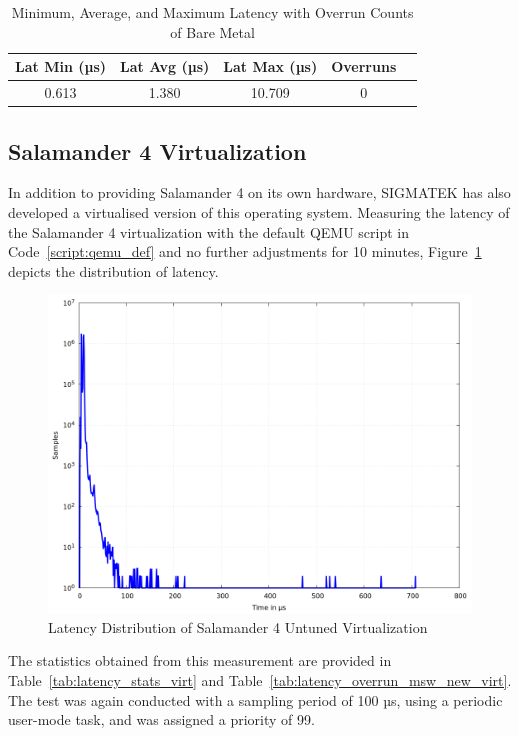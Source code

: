 \documentclass[MMR,Master,english]{twbook}
\begin{document}
\begin{table}[H]
	\centering
	\caption{Minimum, Average, and Maximum Latency with Overrun Counts of Bare Metal}
	\label{tab:latency_overrun_msw_hardware}
	\begin{tabular}{|c|c|c|c|c|}
		\hline
		\textbf{Lat Min (µs)} & \textbf{Lat Avg (µs)} & \textbf{Lat Max (µs)} & \textbf{Overruns} \\ \hline
		0.613                 & 1.380                 & 10.709                & 0                 \\ \hline
	\end{tabular}
\end{table}

\subsection{Salamander 4 Virtualization}\label{subsec:salamander4-virtualization}
In addition to providing Salamander 4 on its own hardware, SIGMATEK has also developed a virtualised version of this operating system. Measuring the latency of the Salamander 4 virtualization with the default QEMU script in Code~\ref{script:qemu_def} and no further adjustments for 10 minutes, Figure~\ref{fig:gnuplot_max_latency_default} depicts the distribution of latency.

\begin{figure}[H]
	\centering
	\includegraphics[width=0.7\columnwidth]{masterthesis-documentation/docs/sigmatek/xenomai/1default/gnuplot_max_latency_default.png}
	\caption[Latency Distribution of Salamander 4 Untuned Virtualization]{Latency Distribution of Salamander 4 Untuned Virtualization}
	\label{fig:gnuplot_max_latency_default}
\end{figure}

\noindent The statistics obtained from this measurement are provided in Table~\ref{tab:latency_stats_virt} and Table~\ref{tab:latency_overrun_msw_new_virt}. The test was again conducted with a sampling period of 100 µs, using a periodic user-mode task, and was assigned a priority of 99.
\end{document}
